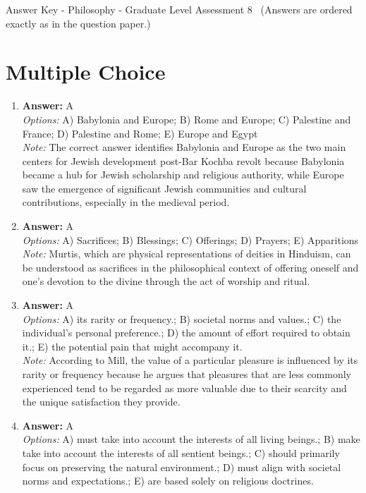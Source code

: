 \documentclass[12pt]{article}
\begin{document}
\begin{center}
Answer Key - Philosophy - Graduate Level Assessment 8 \
\small (Answers are ordered exactly as in the question paper.)
\end{center}

\section*{Multiple Choice}
\begin{enumerate}[label=\arabic*.]
\item \textbf{Answer:} A
\\ \textit{Options:} A) Babylonia and Europe; B) Rome and Europe; C) Palestine and France; D) Palestine and Rome; E) Europe and Egypt
\\ \textit{Note:} The correct answer identifies Babylonia and Europe as the two main centers for Jewish development post-Bar Kochba revolt because Babylonia became a hub for Jewish scholarship and religious authority, while Europe saw the emergence of significant Jewish communities and cultural contributions, especially in the medieval period.
\item \textbf{Answer:} A
\\ \textit{Options:} A) Sacrifices; B) Blessings; C) Offerings; D) Prayers; E) Apparitions
\\ \textit{Note:} Murtis, which are physical representations of deities in Hinduism, can be understood as sacrifices in the philosophical context of offering oneself and one's devotion to the divine through the act of worship and ritual.
\item \textbf{Answer:} A
\\ \textit{Options:} A) its rarity or frequency.; B) societal norms and values.; C) the individual's personal preference.; D) the amount of effort required to obtain it.; E) the potential pain that might accompany it.
\\ \textit{Note:} According to Mill, the value of a particular pleasure is influenced by its rarity or frequency because he argues that pleasures that are less commonly experienced tend to be regarded as more valuable due to their scarcity and the unique satisfaction they provide.
\item \textbf{Answer:} A
\\ \textit{Options:} A) must take into account the interests of all living beings.; B) make take into account the interests of all sentient beings.; C) should primarily focus on preserving the natural environment.; D) must align with societal norms and expectations.; E) are based solely on religious doctrines.

\end{enumerate}
\end{document}
